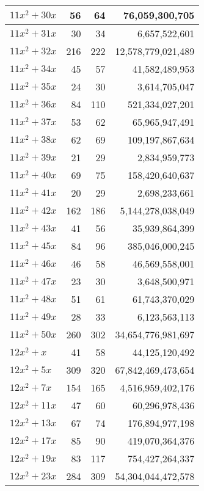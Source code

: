 \documentclass[a4paper]{amsproc}
\theoremstyle{plain}
\theoremstyle{named}
\begin{document}
\begin{longtable}{ | l | r | r | r | }
$11x^2 + 30x$ & 56 & 64 & 76{,}059{,}300{,}705 \\ \hline
$11x^2 + 31x$ & 30 & 34 & 6{,}657{,}522{,}601 \\ \hline
$11x^2 + 32x$ & 216 & 222 & 12{,}578{,}779{,}021{,}489 \\ \hline
$11x^2 + 34x$ & 45 & 57 & 41{,}582{,}489{,}953 \\ \hline
$11x^2 + 35x$ & 24 & 30 & 3{,}614{,}705{,}047 \\ \hline
$11x^2 + 36x$ & 84 & 110 & 521{,}334{,}027{,}201 \\ \hline
$11x^2 + 37x$ & 53 & 62 & 65{,}965{,}947{,}491 \\ \hline
$11x^2 + 38x$ & 62 & 69 & 109{,}197{,}867{,}634 \\ \hline
$11x^2 + 39x$ & 21 & 29 & 2{,}834{,}959{,}773 \\ \hline
$11x^2 + 40x$ & 69 & 75 & 158{,}420{,}640{,}637 \\ \hline
$11x^2 + 41x$ & 20 & 29 & 2{,}698{,}233{,}661 \\ \hline
$11x^2 + 42x$ & 162 & 186 & 5{,}144{,}278{,}038{,}049 \\ \hline
$11x^2 + 43x$ & 41 & 56 & 35{,}939{,}864{,}399 \\ \hline
$11x^2 + 45x$ & 84 & 96 & 385{,}046{,}000{,}245 \\ \hline
$11x^2 + 46x$ & 46 & 58 & 46{,}569{,}558{,}001 \\ \hline
$11x^2 + 47x$ & 23 & 30 & 3{,}648{,}500{,}971 \\ \hline
$11x^2 + 48x$ & 51 & 61 & 61{,}743{,}370{,}029 \\ \hline
$11x^2 + 49x$ & 28 & 33 & 6{,}123{,}563{,}113 \\ \hline
$11x^2 + 50x$ & 260 & 302 & 34{,}654{,}776{,}981{,}697 \\ \hline
$12x^2 + x$ & 41 & 58 & 44{,}125{,}120{,}492 \\ \hline
$12x^2 + 5x$ & 309 & 320 & 67{,}842{,}469{,}473{,}654 \\ \hline
$12x^2 + 7x$ & 154 & 165 & 4{,}516{,}959{,}402{,}176 \\ \hline
$12x^2 + 11x$ & 47 & 60 & 60{,}296{,}978{,}436 \\ \hline
$12x^2 + 13x$ & 67 & 74 & 176{,}894{,}977{,}198 \\ \hline
$12x^2 + 17x$ & 85 & 90 & 419{,}070{,}364{,}376 \\ \hline
$12x^2 + 19x$ & 83 & 117 & 754{,}427{,}264{,}337 \\ \hline
$12x^2 + 23x$ & 284 & 309 & 54{,}304{,}044{,}472{,}578 \\ \hline

\end{longtable}
\end{document}
